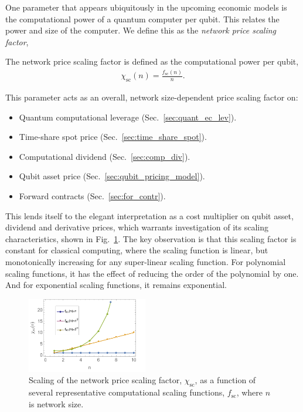 One parameter that appears ubiquitously in the upcoming economic models is the computational power of a quantum computer per qubit. This relates the power and size of the computer. We define this as the \textit{network price scaling factor},

\begin{definition}\label{def:NPSF}
The network price scaling factor is defined as the computational power per qubit,
\begin{align}
\chi_\text{sc}(n) = \frac{f_\text{sc}(n)}{n}.
\end{align}
\end{definition}

This parameter acts as an overall, network size-dependent price scaling factor on:
\begin{itemize}
\item Quantum computational leverage (Sec.~\ref{sec:quant_ec_lev}).
\item Time-share spot price (Sec.~\ref{sec:time_share_spot}).
\item Computational dividend (Sec.~\ref{sec:comp_div}).
\item Qubit asset price (Sec.~\ref{sec:qubit_pricing_model}).
\item Forward contracts (Sec.~\ref{sec:for_contr}).
\end{itemize}

This lends itself to the elegant interpretation as a cost multiplier on qubit asset, dividend and derivative prices, which warrants investigation of its scaling characteristics, shown in Fig.~\ref{fig:NPSF}. The key observation is that this scaling factor is constant for classical computing, where the scaling function is linear, but monotonically increasing for any super-linear scaling function. For polynomial scaling functions, it has the effect of reducing the order of the polynomial by one. And for exponential scaling functions, it remains exponential.

\begin{figure}[htb!]
	\includegraphics[width=0.47\textwidth]{network_price_scaling_factor}
	\caption{Scaling of the network price scaling factor, $\chi_\text{sc}$, as a function of several representative computational scaling functions, $f_\text{sc}$, where $n$ is network size.} \label{fig:NPSF}
\end{figure}

